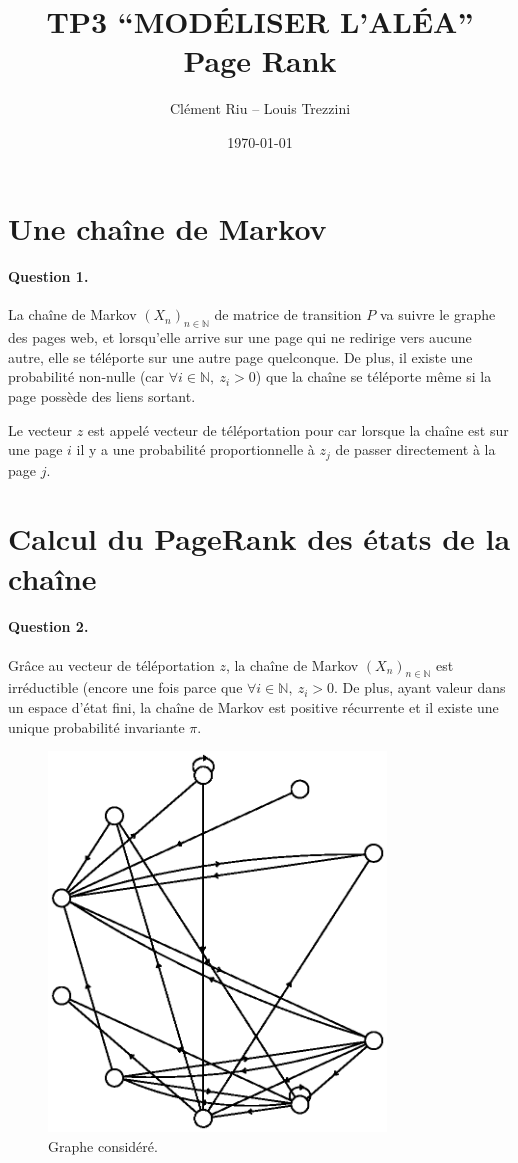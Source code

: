 \documentclass[12pt,a4paper]{article}
\title{\vspace{-3em}\textbf{TP3 “MODÉLISER L’ALÉA” \\ Page Rank}}
\author{Clément Riu -- Louis Trezzini}
\date{\today}
\newcommand{\N}{\mathbb{N}}
\begin{document}
\maketitle

\section{Une chaîne de Markov}

\paragraph*{Question 1.}
La chaîne de Markov $(X_n)_{n \in \N}$ de matrice de transition $P$ va suivre le graphe des pages web, et lorsqu'elle arrive sur une page qui ne redirige vers aucune autre, elle se téléporte sur une autre page quelconque. De plus, il existe une probabilité non-nulle (car $\forall i \in \N, \ z_i > 0$) que la chaîne se téléporte même si la page possède des liens sortant.

Le vecteur $z$ est appelé vecteur de téléportation pour car lorsque la chaîne est sur une page $i$ il y a une probabilité proportionnelle à $z_j$ de passer directement à la page $j$.

\section{Calcul du PageRank des états de la chaîne}

\paragraph*{Question 2.}
Grâce au vecteur de téléportation $z$, la chaîne de Markov $(X_n)_{n \in \N}$ est irréductible (encore une fois parce que $\forall i \in \N, \ z_i > 0$. De plus, ayant valeur dans un espace d'état fini, la chaîne de Markov est positive récurrente et il existe une unique probabilité invariante $\pi$.

\begin{figure}[H]
    \centering
    \includegraphics[width=0.8\textwidth]{q2.eps}
    \caption{Graphe considéré.}
\end{figure}
\end{document}
